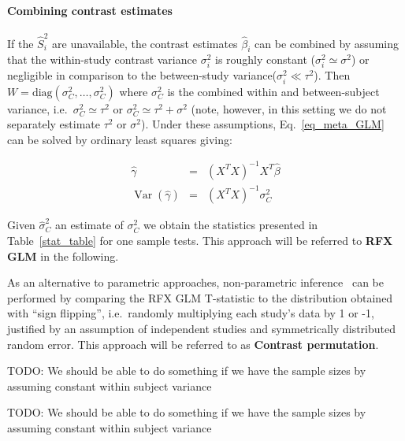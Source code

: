\documentclass[preprint,12pt]{elsarticle}
\DeclareMathOperator{\Var}{Var}
\newcommand{\effectvector}{\hat\beta}
\newcommand{\effect}[1][i]{\effectvector_{#1}}
\newcommand{\vareffect}[1][i]{\hat S^2_{#1}}
\newcommand{\varCombined}{\sigma^2_{C}}
\newcommand{\estvarCombined}{\hat\sigma^2_{C}}
\newcommand{\metaanalyticeffect}{\gamma}
\newcommand{\varBetween}{\tau^2}
\newcommand{\varWithinCommon}{\sigma^2}
\newcommand{\varWithin}[1][i]{\sigma^2_{#1}}
\newcommand{\transpose}{^T}
\begin{document}
\paragraph{Combining contrast estimates}
If the $\vareffect$ are unavailable, the contrast estimates $\effect$ can be combined by assuming that the within-study contrast variance $\varWithin$ is roughly constant ($\varWithin \simeq \sigma^2$) or negligible in comparison to the between-study variance($\varWithin \ll \varBetween$). Then $W = \mathrm{diag}( \varCombined, \ldots, \varCombined )$ where $\varCombined$ is the combined within and between-subject variance, i.e.\ $\varCombined \simeq \varBetween$ or $\varCombined \simeq \varBetween + \varWithinCommon$ (note, however, in this setting we do not separately estimate $\varBetween$ or $\varWithinCommon$). Under these assumptions, Eq.~\eqref{eq_meta_GLM} can be solved by ordinary least squares giving:

\begin{eqnarray}
	\hat \metaanalyticeffect  &=& (X\transpose X)^{-1} X\transpose \effectvector \\
	\Var(\hat \metaanalyticeffect)  &=& (X\transpose X)^{-1} \varCombined
	\label{eq_OLS}
\end{eqnarray}

Given $\estvarCombined$ an estimate of $\varCombined$ we obtain the statistics presented in Table~\ref{stat_table} for one sample tests. This approach will be referred to \textbf{RFX GLM} in the following.

As an alternative to parametric approaches, non-parametric inference~\cite{Holmes1996,Nichols2002} can be performed by comparing the RFX GLM T-statistic to the distribution obtained with ``sign flipping'', i.e.\ randomly multiplying each study's data by 1 or -1, justified by an assumption of independent studies and symmetrically distributed random error. This approach will be referred to as \textbf{Contrast permutation}.

TODO: We should be able to do something if we have the sample sizes by assuming constant within subject variance

TODO: We should be able to do something if we have the sample sizes by assuming constant within subject variance
\end{document}
